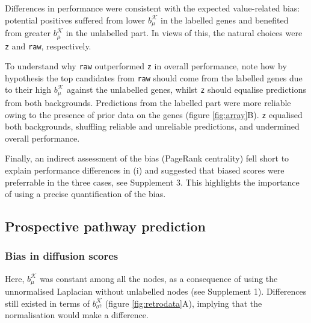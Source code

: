 \documentclass[final]{bioinfo}
\newcommand{\method}{\texttt}
\newcommand{\ebias}{b_{\mu}^{\mathcal{K}}}
\newcommand{\vbias}{b_{\sigma^2}^{\mathcal{K}}}
\begin{document}
Differences in performance were consistent with the expected value-related bias: potential positives suffered from lower $\ebias$ in the labelled genes and benefited from greater $\ebias$ in the unlabelled part. 
In views of this, the natural choices were \method{z} and \method{raw}, respectively. 

To understand why \method{raw} outperformed \method{z} in overall performance, note how by hypothesis the top candidates from \method{raw} should come from the labelled genes due to their high $\ebias$ against the unlabelled genes, whilst \method{z} should equalise predictions from both backgrounds. 
Predictions from the labelled part were more reliable owing to the presence of prior data on the genes (figure \ref{fig:array}B). 
\method{z} equalised both backgrounds, shuffling reliable and unreliable predictions, and undermined overall performance. 

Finally, an indirect assessment of the bias (PageRank centrality) fell short to explain performance differences in (i) and suggested that biased scores were preferrable in the three cases, see Supplement 3.
This highlights the importance of using a precise quantification of the bias.

\subsection*{Prospective pathway prediction}

\subsubsection*{Bias in diffusion scores}

Here, $\ebias$ was constant among all the nodes, as a consequence of using the unnormalised Laplacian without unlabelled nodes (see Supplement 1). 
Differences still existed in terms of $\vbias$ (figure \ref{fig:retrodata}A), implying that the normalisation would make a difference. 
\end{document}
